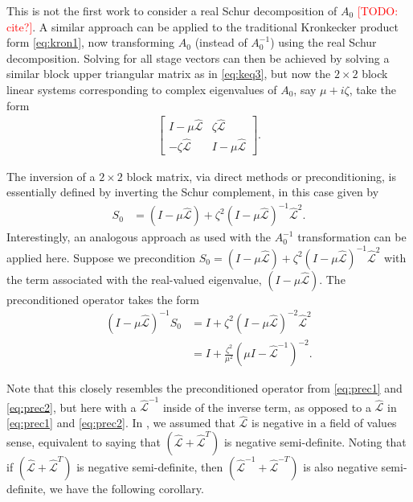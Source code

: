 \documentclass[review]{siamart}
\makeatletter
\newcommand{\todo}[1]{\textcolor{red}{[TODO\@: #1]}}
\makeatother
\begin{document}
%
%
%
\begin{remark}
This is not the first work to consider a real Schur decomposition of $A_0$
\todo{cite?}. A similar approach can be applied to the traditional Kronkecker
product form \eqref{eq:kron1}, now transforming $A_0$ (instead of $A_0^{-1}$)
using the real Schur decomposition. Solving for all stage vectors can then 
be achieved by solving a similar block upper triangular matrix as in
\eqref{eq:keq3}, but now the $2\times 2$ block linear systems corresponding
to complex eigenvalues of
$A_0$, say $\mu + i\zeta$, take the form 
\begin{align*}
\begin{bmatrix} I - \mu\widehat{\mathcal{L}} & \zeta\widehat{\mathcal{L}} \\
	-\zeta\widehat{\mathcal{L}} & I - \mu\widehat{\mathcal{L}} \end{bmatrix}.
\end{align*}

The inversion of a $2\times 2$ block matrix, via direct methods or preconditioning,
is essentially defined by inverting the Schur complement, in this case given by 
\begin{align*}
S_0 & = (I - \mu \widehat{\mathcal{L}}) +
	\zeta^2(I - \mu \widehat{\mathcal{L}})^{-1}\widehat{\mathcal{L}}^2.
\end{align*}
Interestingly, an analogous approach as used with the $A_0^{-1}$ transformation
can be applied here. Suppose we precondition $S_0 = (I - \mu \widehat{\mathcal{L}}) +
\zeta^2(I - \mu \widehat{\mathcal{L}})^{-1}\widehat{\mathcal{L}}^2$ with the term
associated with the real-valued eigenvalue, $(I - \mu \widehat{\mathcal{L}})$.
The preconditioned operator takes the form
\begin{align*}
(I - \mu \widehat{\mathcal{L}})^{-1}S_0 & = I + 
	\zeta^2(I - \mu \widehat{\mathcal{L}})^{-2}\widehat{\mathcal{L}}^2 \\
& = I + \frac{\zeta^2}{\mu^2}(\mu I - \widehat{\mathcal{L}}^{-1})^{-2}.
\end{align*}

Note that this closely resembles the preconditioned operator from \eqref{eq:prec1}
and \eqref{eq:prec2}, but here with a $\widehat{\mathcal{L}}^{-1}$ inside of the
inverse term, as opposed to a $\widehat{\mathcal{L}}$ in \eqref{eq:prec1}
and \eqref{eq:prec2}. In , we assumed that $\widehat{\mathcal{L}}$
is negative in a field of values sense, equivalent to saying that
$(\widehat{\mathcal{L}} + \widehat{\mathcal{L}}^T)$ is negative semi-definite.
Noting that if $(\widehat{\mathcal{L}} + \widehat{\mathcal{L}}^T)$ is
negative semi-definite, then $(\widehat{\mathcal{L}}^{-1} +
\widehat{\mathcal{L}}^{-T})$ is also negative semi-definite, we have the
following corollary.
\end{remark}
%
\end{document}

